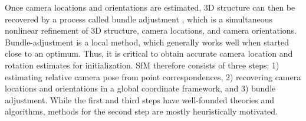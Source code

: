 
Once camera locations and orientations are estimated, 3D structure can then be recovered by a process called bundle adjustment \cite{1dSfm_22}, which is a simultaneous nonlinear refinement of 3D structure, camera locations, and camera orientations.
Bundle-adjustment is a local method, which generally works well when started close to an optimum. Thus, it is critical to obtain accurate camera location and rotation estimates for initialization. SfM therefore consists of three steps: 1) estimating relative camera pose from point correspondences, 2) recovering camera locations and orientations in a global coordinate framework, and 3) bundle adjustment. While the first and third steps have well-founded theories and algorithms, methods for the second step are mostly heuristically motivated. 

